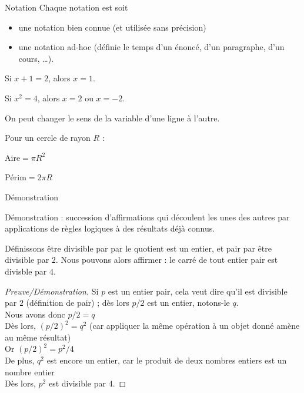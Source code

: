 \begin{frame}{Notation}
  Chaque notation est soit
  \begin{itemize}
  \item une notation bien connue (et utilisée sans précision)
  \item une notation ad-hoc (définie le temps d'un énoncé, d'un paragraphe, d'un cours, \dots).
  \end{itemize}
  \begin{example}
    Si \(x + 1 = 2\), alors \(x = 1\).\pause

    Si \(x^{2} = 4\), alors \(x = 2\) ou \(x = -2\).\pause

    On peut changer le sens de la variable d'une ligne à l'autre.
  \end{example}
  \begin{example}
    Pour un cercle de rayon \(R\) :

    \(\text{Aire} = \pi{R^2}\)

    \(\text{Périm} = 2 \pi{R}\)
  \end{example}
\end{frame}

\begin{frame}{Démonstration}
  \begin{definition}
    Démonstration : succession d'affirmations qui découlent les unes des autres par applications de règles logiques à des résultats déjà connus.
  \end{definition}
\end{frame}
\begin{frame}
  
  \begin{example}Définissons \og être divisible par\fg{} par \og le quotient est un entier\fg{}, et \og pair\fg{} par \og être divisible par \(2\)\fg{}. Nous pouvons alors affirmer : le carré de tout entier pair est divisble par \(4\).
    \begin{proof}[Preuve/Démonstration]
      Si \(p\) est un entier pair, cela veut dire qu'il est divisible par \(2\) (définition de \og pair\fg{}) ; dès lors \(p/2\) est un entier, notons-le \(q\).\\
      Nous avons donc \(p/2 = q\)\\
      Dès lors, \((p/2)^{2} = q^{2}\) (car appliquer la même opération à un objet donné amène au même résultat)\\
      Or \((p/2)^{2} = p^{2}/4\)\\
      De plus, \(q^{2}\) est encore un entier, car le produit de deux nombres entiers est un nombre entier\\
      Dès lors, \(p^{2}\) est divisible par \(4\).
    \end{proof}
  \end{example}
\end{frame}

